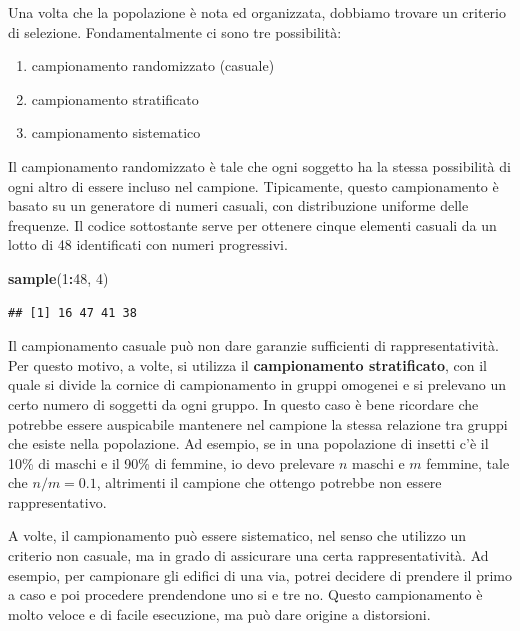 \documentclass[a4paper,12pt,oneside]{book}
\providecommand{\tightlist}{%
  \setlength{\itemsep}{0pt}\setlength{\parskip}{0pt}}
\newenvironment{Shaded}{\begin{snugshade}}{\end{snugshade}}
\newcommand{\KeywordTok}[1]{\textcolor[rgb]{0.13,0.29,0.53}{\textbf{#1}}}
\newcommand{\DecValTok}[1]{\textcolor[rgb]{0.00,0.00,0.81}{#1}}
\newcommand{\OperatorTok}[1]{\textcolor[rgb]{0.81,0.36,0.00}{\textbf{#1}}}
\newcommand{\NormalTok}[1]{#1}
\begin{document}
Una volta che la popolazione è nota ed organizzata, dobbiamo trovare un
criterio di selezione. Fondamentalmente ci sono tre possibilità:

\begin{enumerate}
\def\labelenumi{\arabic{enumi}.}
\tightlist
\item
  campionamento randomizzato (casuale)
\item
  campionamento stratificato
\item
  campionamento sistematico
\end{enumerate}

Il campionamento randomizzato è tale che ogni soggetto ha la stessa
possibilità di ogni altro di essere incluso nel campione. Tipicamente,
questo campionamento è basato su un generatore di numeri casuali, con
distribuzione uniforme delle frequenze. Il codice sottostante serve per
ottenere cinque elementi casuali da un lotto di 48 identificati con
numeri progressivi.

\begin{Shaded}
\begin{Highlighting}[]
\KeywordTok{sample}\NormalTok{(}\DecValTok{1}\OperatorTok{:}\DecValTok{48}\NormalTok{, }\DecValTok{4}\NormalTok{)}
\end{Highlighting}
\end{Shaded}

\begin{verbatim}
## [1] 16 47 41 38
\end{verbatim}

Il campionamento casuale può non dare garanzie sufficienti di
rappresentatività. Per questo motivo, a volte, si utilizza il
\textbf{campionamento stratificato}, con il quale si divide la cornice
di campionamento in gruppi omogenei e si prelevano un certo numero di
soggetti da ogni gruppo. In questo caso è bene ricordare che potrebbe
essere auspicabile mantenere nel campione la stessa relazione tra gruppi
che esiste nella popolazione. Ad esempio, se in una popolazione di
insetti c'è il 10\% di maschi e il 90\% di femmine, io devo prelevare
\(n\) maschi e \(m\) femmine, tale che \(n/m = 0.1\), altrimenti il
campione che ottengo potrebbe non essere rappresentativo.

A volte, il campionamento può essere sistematico, nel senso che utilizzo
un criterio non casuale, ma in grado di assicurare una certa
rappresentatività. Ad esempio, per campionare gli edifici di una via,
potrei decidere di prendere il primo a caso e poi procedere prendendone
uno si e tre no. Questo campionamento è molto veloce e di facile
esecuzione, ma può dare origine a distorsioni.
\end{document}
